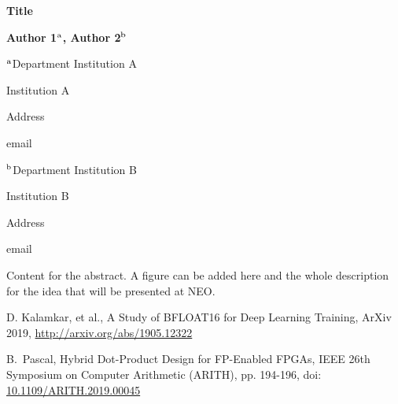 \documentclass[a4paper,12pt]{article}
\begin{document}
\centerline{\bf Title}

\vspace{12pt}

\centerline{ {\bf Author 1$^{\rm a}$,  {\bf Author 2$^{\rm b}$} } }

\vspace{12pt}

\centerline{$^{\rm a}$Department Institution A}
\centerline{Institution A}
\centerline{Address}
\centerline{email}

\vspace{12pt}

\centerline{$^{\rm b}$Department Institution B}
\centerline{Institution B}
\centerline{Address}
\centerline{email}

\vspace{12pt}
\vspace{12pt}

Content for the abstract. A figure can be added here and the whole description
for the idea that will be presented at NEO.




\begin{thebibliography}{1}

\newblock D. Kalamkar, et al.,
\newblock A Study of {BFLOAT16} for Deep Learning Training,
\newblock ArXiv 2019, \url{http://arxiv.org/abs/1905.12322}

\newblock B.\ Pascal,
\newblock Hybrid Dot-Product Design for FP-Enabled FPGAs,
 IEEE 26th Symposium on Computer Arithmetic (ARITH),
\newblock pp. 194-196, doi: \url{10.1109/ARITH.2019.00045}

\end{thebibliography}
\end{document}
